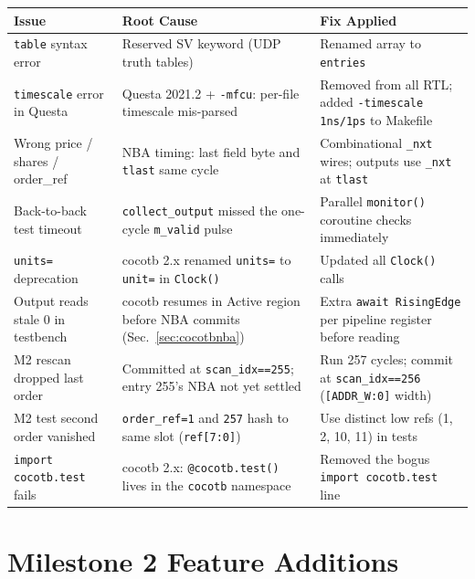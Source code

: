 \documentclass[11pt,a4paper]{article}
\begin{document}
\begin{center}
\small
\begin{tabular}{p{3.0cm} p{4.2cm} p{5.5cm}}
\toprule
\textbf{Issue} & \textbf{Root Cause} & \textbf{Fix Applied} \\
\midrule
\texttt{table} syntax error &
  Reserved SV keyword (UDP truth tables) &
  Renamed array to \texttt{entries} \\
\addlinespace
\texttt{timescale} error in Questa &
  Questa 2021.2 + \texttt{-mfcu}: per-file timescale mis-parsed &
  Removed from all RTL; added \texttt{-timescale 1ns/1ps} to Makefile \\
\addlinespace
Wrong price / shares / order\_ref &
  NBA timing: last field byte and \texttt{tlast} same cycle &
  Combinational \texttt{\_nxt} wires; outputs use \texttt{\_nxt} at \texttt{tlast} \\
\addlinespace
Back-to-back test timeout &
  \texttt{collect\_output} missed the one-cycle \texttt{m\_valid} pulse &
  Parallel \texttt{monitor()} coroutine checks immediately \\
\addlinespace
\texttt{units=} deprecation &
  cocotb 2.x renamed \texttt{units=} to \texttt{unit=} in \texttt{Clock()} &
  Updated all \texttt{Clock()} calls \\
\addlinespace
Output reads stale 0 in testbench &
  cocotb resumes in Active region before NBA commits (Sec.~\ref{sec:cocotbnba}) &
  Extra \texttt{await RisingEdge} per pipeline register before reading \\
\addlinespace
M2 rescan dropped last order &
  Committed at \texttt{scan\_idx==255}; entry 255's NBA not yet settled &
  Run 257 cycles; commit at \texttt{scan\_idx==256} (\texttt{[ADDR\_W:0]} width) \\
\addlinespace
M2 test second order vanished &
  \texttt{order\_ref=1} and \texttt{257} hash to same slot (\texttt{ref[7:0]}) &
  Use distinct low refs (1, 2, 10, 11) in tests \\
\addlinespace
\texttt{import cocotb.test} fails &
  cocotb 2.x: \texttt{@cocotb.test()} lives in the \texttt{cocotb} namespace &
  Removed the bogus \texttt{import cocotb.test} line \\
\bottomrule
\end{tabular}
\end{center}

\section{Milestone 2 Feature Additions}
\label{sec:m2add}
\end{document}
